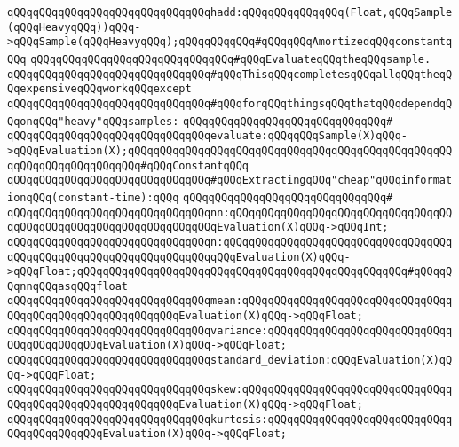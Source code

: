 \verb|qQQqqQQqqQQqqQQqqQQqqQQqqQQqqQQqhadd:qQQqqQQqqQQqqQQq(Float,qQQqSample(qQQqHeavyqQQq))qQQq->qQQqSample(qQQqHeavyqQQq);qQQqqQQqqQQq#qQQqqQQqAmortizedqQQqconstantqQQq|\newline
\newline
\newline
\newline
\verb|qQQqqQQqqQQqqQQqqQQqqQQqqQQqqQQq#qQQqEvaluateqQQqtheqQQqsample.|\newline
\verb|qQQqqQQqqQQqqQQqqQQqqQQqqQQqqQQq#qQQqThisqQQqcompletesqQQqallqQQqtheqQQqexpensiveqQQqworkqQQqexcept|\newline
\verb|qQQqqQQqqQQqqQQqqQQqqQQqqQQqqQQq#qQQqforqQQqthingsqQQqthatqQQqdependqQQqonqQQq"heavy"qQQqsamples:|\newline
\verb|qQQqqQQqqQQqqQQqqQQqqQQqqQQqqQQq#|\newline
\verb|qQQqqQQqqQQqqQQqqQQqqQQqqQQqqQQqevaluate:qQQqqQQqSample(X)qQQq->qQQqEvaluation(X);qQQqqQQqqQQqqQQqqQQqqQQqqQQqqQQqqQQqqQQqqQQqqQQqqQQqqQQqqQQqqQQqqQQqqQQq#qQQqConstantqQQq|\newline
\newline
\newline
\verb|qQQqqQQqqQQqqQQqqQQqqQQqqQQqqQQq#qQQqExtractingqQQq"cheap"qQQqinformationqQQq(constant-time):qQQq|\newline
\verb|qQQqqQQqqQQqqQQqqQQqqQQqqQQqqQQq#|\newline
\verb|qQQqqQQqqQQqqQQqqQQqqQQqqQQqqQQqnn:qQQqqQQqqQQqqQQqqQQqqQQqqQQqqQQqqQQqqQQqqQQqqQQqqQQqqQQqqQQqqQQqqQQqEvaluation(X)qQQq->qQQqInt;|\newline
\verb|qQQqqQQqqQQqqQQqqQQqqQQqqQQqqQQqn:qQQqqQQqqQQqqQQqqQQqqQQqqQQqqQQqqQQqqQQqqQQqqQQqqQQqqQQqqQQqqQQqqQQqqQQqEvaluation(X)qQQq->qQQqFloat;qQQqqQQqqQQqqQQqqQQqqQQqqQQqqQQqqQQqqQQqqQQqqQQqqQQq#qQQqqQQqnnqQQqasqQQqfloat|\newline
\verb|qQQqqQQqqQQqqQQqqQQqqQQqqQQqqQQqmean:qQQqqQQqqQQqqQQqqQQqqQQqqQQqqQQqqQQqqQQqqQQqqQQqqQQqqQQqqQQqEvaluation(X)qQQq->qQQqFloat;|\newline
\verb|qQQqqQQqqQQqqQQqqQQqqQQqqQQqqQQqvariance:qQQqqQQqqQQqqQQqqQQqqQQqqQQqqQQqqQQqqQQqqQQqEvaluation(X)qQQq->qQQqFloat;|\newline
\verb|qQQqqQQqqQQqqQQqqQQqqQQqqQQqqQQqstandard_deviation:qQQqEvaluation(X)qQQq->qQQqFloat;|\newline
\verb|qQQqqQQqqQQqqQQqqQQqqQQqqQQqqQQqskew:qQQqqQQqqQQqqQQqqQQqqQQqqQQqqQQqqQQqqQQqqQQqqQQqqQQqqQQqqQQqEvaluation(X)qQQq->qQQqFloat;|\newline
\verb|qQQqqQQqqQQqqQQqqQQqqQQqqQQqqQQqkurtosis:qQQqqQQqqQQqqQQqqQQqqQQqqQQqqQQqqQQqqQQqqQQqEvaluation(X)qQQq->qQQqFloat;|\newline
